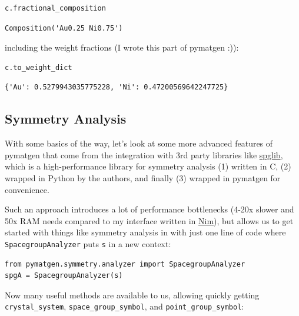 \begin{verbatim}
c.fractional_composition
\end{verbatim}

\begin{verbatim}
Composition('Au0.25 Ni0.75')
\end{verbatim}

including the weight fractions (I wrote this part of pymatgen :)):

\begin{verbatim}
c.to_weight_dict
\end{verbatim}

\begin{verbatim}
{'Au': 0.5279943035775228, 'Ni': 0.47200569642247725}
\end{verbatim}

\hypertarget{symmetry-analysis}{%
\subsection{Symmetry Analysis}\label{pysipfenntutorial:symmetry-analysis}}

With some basics of the way, let's look at some more advanced features
of pymatgen that come from the integration with 3rd party libraries like
\href{https://spglib.readthedocs.io/en/latest/index.html}{spglib}, which
is a high-performance library for symmetry analysis (1) written in C,
(2) wrapped in Python by the authors, and finally (3) wrapped in
pymatgen for convenience.

Such an approach introduces a lot of performance bottlenecks (4-20x
slower and 50x RAM needs compared to my interface written in
\href{https://nim-lang.org}{Nim}), but allows us to get started with
things like symmetry analysis in with just one line of code where
\texttt{SpacegroupAnalyzer} puts
\texttt{s} in a new context:

\begin{verbatim}
from pymatgen.symmetry.analyzer import SpacegroupAnalyzer
spgA = SpacegroupAnalyzer(s)
\end{verbatim}

Now many useful methods are available to us, allowing quickly getting
\texttt{crystal\_system},
\texttt{space\_group\_symbol}, and
\texttt{point\_group\_symbol}:

